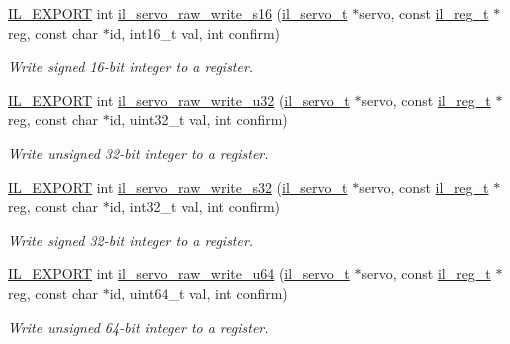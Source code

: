 \begin{DoxyCompactItemize}
\hyperlink{common_8h_a6bb629d26c52bfe10519ba3176853f47}{I\+L\+\_\+\+E\+X\+P\+O\+RT} int \hyperlink{group__IL__SERVO_ga42b17982936b1ce7982e5d16c3f6c090}{il\+\_\+servo\+\_\+raw\+\_\+write\+\_\+s16} (\hyperlink{group__IL__SERVO_ga3369ddfcc33492fe3a28f96cf455b13e}{il\+\_\+servo\+\_\+t} $\ast$servo, const \hyperlink{structil__reg__t}{il\+\_\+reg\+\_\+t} $\ast$reg, const char $\ast$id, int16\+\_\+t val, int confirm)
\begin{DoxyCompactList}\small\item\em Write signed 16-\/bit integer to a register. \end{DoxyCompactList}\item 
\hyperlink{common_8h_a6bb629d26c52bfe10519ba3176853f47}{I\+L\+\_\+\+E\+X\+P\+O\+RT} int \hyperlink{group__IL__SERVO_gac212376609f84669eb9792b676f453a3}{il\+\_\+servo\+\_\+raw\+\_\+write\+\_\+u32} (\hyperlink{group__IL__SERVO_ga3369ddfcc33492fe3a28f96cf455b13e}{il\+\_\+servo\+\_\+t} $\ast$servo, const \hyperlink{structil__reg__t}{il\+\_\+reg\+\_\+t} $\ast$reg, const char $\ast$id, uint32\+\_\+t val, int confirm)
\begin{DoxyCompactList}\small\item\em Write unsigned 32-\/bit integer to a register. \end{DoxyCompactList}\item 
\hyperlink{common_8h_a6bb629d26c52bfe10519ba3176853f47}{I\+L\+\_\+\+E\+X\+P\+O\+RT} int \hyperlink{group__IL__SERVO_gac07e7c8a81f9905d1fa9b447395270bc}{il\+\_\+servo\+\_\+raw\+\_\+write\+\_\+s32} (\hyperlink{group__IL__SERVO_ga3369ddfcc33492fe3a28f96cf455b13e}{il\+\_\+servo\+\_\+t} $\ast$servo, const \hyperlink{structil__reg__t}{il\+\_\+reg\+\_\+t} $\ast$reg, const char $\ast$id, int32\+\_\+t val, int confirm)
\begin{DoxyCompactList}\small\item\em Write signed 32-\/bit integer to a register. \end{DoxyCompactList}\item 
\hyperlink{common_8h_a6bb629d26c52bfe10519ba3176853f47}{I\+L\+\_\+\+E\+X\+P\+O\+RT} int \hyperlink{group__IL__SERVO_gacd041c7dd2ac1ec99d2cf1aa6f046a00}{il\+\_\+servo\+\_\+raw\+\_\+write\+\_\+u64} (\hyperlink{group__IL__SERVO_ga3369ddfcc33492fe3a28f96cf455b13e}{il\+\_\+servo\+\_\+t} $\ast$servo, const \hyperlink{structil__reg__t}{il\+\_\+reg\+\_\+t} $\ast$reg, const char $\ast$id, uint64\+\_\+t val, int confirm)
\begin{DoxyCompactList}\small\item\em Write unsigned 64-\/bit integer to a register. \end{DoxyCompactList}\item 

\end{DoxyCompactItemize}
